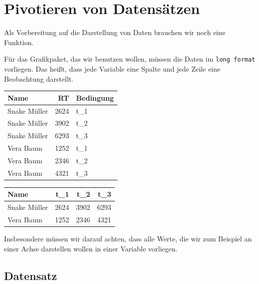 \documentclass[
]{book}
\begin{document}
\hypertarget{pivotieren-von-datensuxe4tzen}{%
\section{Pivotieren von Datensätzen}\label{pivotieren-von-datensuxe4tzen}}

Als Vorbereitung auf die Darstellung von Daten brauchen wir noch eine Funktion.

Für das Grafikpaket, das wir benutzen wollen, müssen die Daten im \texttt{long\ format} vorliegen. Das heißt, dass jede Variable eine Spalte und jede Zeile eine Beobachtung darstellt.

\begin{table}
\centering\begingroup\fontsize{15}{17}\selectfont

\begin{tabular}{l|r|l}
\hline
Name & RT & Bedingung\\
\hline
Snake Müller & 2624 & t\_1\\
\hline
Snake Müller & 3902 & t\_2\\
\hline
Snake Müller & 6293 & t\_3\\
\hline
Vera Baum & 1252 & t\_1\\
\hline
Vera Baum & 2346 & t\_2\\
\hline
Vera Baum & 4321 & t\_3\\
\hline
\end{tabular}
\endgroup{}
\end{table}

\begin{table}
\centering\begingroup\fontsize{15}{17}\selectfont

\begin{tabular}{l|r|r|r}
\hline
Name & t\_1 & t\_2 & t\_3\\
\hline
Snake Müller & 2624 & 3902 & 6293\\
\hline
Vera Baum & 1252 & 2346 & 4321\\
\hline
\end{tabular}
\endgroup{}
\end{table}

Insbesondere müssen wir darauf achten, dass alle Werte, die wir zum Beispiel an einer Achse darstellen wollen in einer Variable vorliegen.

\hypertarget{datensatz}{%
\subsection{Datensatz}\label{datensatz}}
\end{document}
